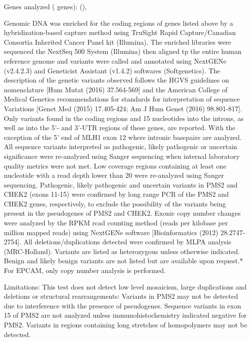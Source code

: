 \documentclass[10pt]{article}
\newcommand{\data}[1]{}
\newenvironment{dataiter}[1]{}{}
\begin{document}
{\small
Genes analyzed (\data{num_tested_genes} genes): \begin{dataiter}{tested_genes}\data{gene_symbol} (\data{refseq_mrna}), \end{dataiter}

Genomic DNA was enriched for the coding regions of genes listed above by a hybridization-based capture method using TruSight Rapid Capture/Canadian Consortia Inherited Cancer Panel kit (Illumina). The enriched libraries were sequenced the NextSeq 500 System (Illumina) then aligned tp the entire \data{reference_genome} human reference genome and variants were called and annotated using NextGENe (v2.4.2.3) and Geneticist Assistant (v1.4.2) softwares (Softgenetics). The description of the genetic variants observed follows the HGVS guidelines on nomenclature [Hum Mutat (2016) 37.564-569] and the American College of Medical Genetics recommendations for standards for interpretation of sequence Variations [Genet Med (2015) 17.405-424; Am J Hum Genet (2016) 98.801-817]. Only variants found in the coding regions and 15 nucleotides into the introns, as well as into the 5'- and 3'-UTR regions of these genes, are reported. With the exception of the 5' end of MLH1 exon 12 where intronic basepairs are analyzed. All sequence variants interpreted as pathogenic, likely pathogenic or uncertain significance were re-analyzed using Sanger sequencing when internal laboratory quality metrics were not met. Low coverage regions containing at least one nucleotide with a read depth lower than 20 were re-analyzed using Sanger sequencing. Pathogenic, likely pathogenic and uncertain variants in PMS2 and CHEK2 (exons 11-15) were confirmed by long range PCR of the PMS2 and CHEK2 genes, respectively, to exclude the possibility of the variants being present in the pseudogenes of PMS2 and CHEK2. Exonic copy number changes were analyzed by the RPKM rcad counting method (reads per kilobase per million mapped reads) using NextGENe software [Bioinformatics (2012) 28.2747-2754]. All deletions/duplications detected were confirmed by MLPA analysis (MRC-Holland). Variants are listed as heterozygous unless otherwise indicated.  Benign and likely benign variants are not listed but are available upon request.* For EPCAM, only copy number analysis is performed.

Limitations: This test does not detect low level mosaicism, large duplications and deletions or structural rearrangements: Variants in PMS2 may not be detected due to interference with the presence of pseudogenes. Sequence variants in exon 15 of PMS2 are not analyzed unless immunohistochemistry indicated negative for PMS2. Variants in regions containing long stretches of homopolymers may not be detected.

}
\end{document}
